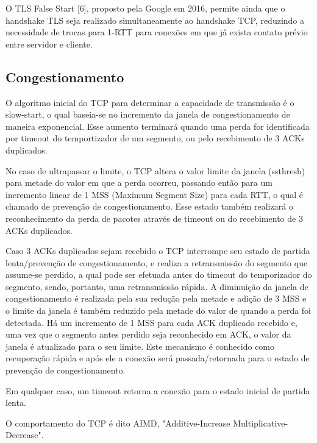 \documentclass{article}
\begin{document}
O TLS False Start [6], proposto pela Google em 2016, permite ainda que o handshake TLS seja realizado simultaneamente ao
handshake TCP, reduzindo a necessidade de trocas para 1-RTT para conexões em que já exista contato prévio entre servidor
e cliente.

\subsection{Congestionamento}
O algoritmo inicial do TCP para determinar a capacidade de transmissão é o slow-start, o qual baseia-se no incremento da
janela de congestionamento de maneira exponencial. Esse aumento terminará quando uma perda for identificada por timeout
do temportizador de um segmento, ou pelo recebimento de 3 ACKs duplicados.

No caso de ultrapassar o limite, o TCP altera o valor
limite da janela (ssthresh) para metade do valor em que a perda ocorreu, passando então para um incremento linear de 1 MSS (Maximum
Segment Size) para cada RTT, o qual é chamado de prevenção de congestionamento. Esse estado também realizará o
reconhecimento da perda de pacotes através de timeout ou do recebimento de 3 ACKs duplicados.

Caso 3 ACKs duplicados sejam recebido o TCP interrompe seu estado de partida lenta/prevenção de congestionamento, e
realiza a retransmissão do segmento que assume-se perdido, a qual pode ser efetuada antes do timeout do temporizador do
segmento, sendo, portanto, uma retransmissão rápida. A diminuição da janela de congestionamento é realizada pela sua
redução pela metade e adição de 3 MSS e o limite da janela é também reduzido pela metade do valor de quando a perda foi
detectada. Há um incremento de 1 MSS para cada ACK duplicado recebido e, uma vez que o segmento antes perdido seja
reconhecido em ACK, o valor da janela é atualizado para o seu limite. Este mecanismo é conhecido como recuperação
rápida e após ele a conexão será passada/retornada para o estado de prevenção de congestionamento.

Em qualquer caso, um timeout retorna a conexão para o estado inicial de partida lenta.


O comportamento do TCP é dito AIMD, "Additive-Increase Multiplicative-Decrease".
\end{document}
